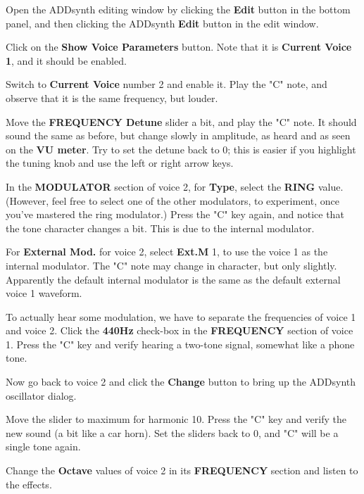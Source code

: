    \begin{enumber}
      \item Open the ADDsynth editing window by clicking the \textbf{Edit} button
         in the bottom panel, and then clicking the ADDsynth \textbf{Edit}
         button in the edit window.
      \item Click on the \textbf{Show Voice Parameters} button.
         Note that it is \textbf{Current Voice 1}, and it should be enabled.
      \item Switch to \textbf{Current Voice} number 2 and enable it.
         Play the "C" note, and observe that it is the same frequency, but
         louder.
      \item Move the \textbf{FREQUENCY Detune} slider a bit, and play the "C"
         note.  It should sound the same as before, but change slowly in
         amplitude, as heard and as seen on the \textbf{VU meter}.
         Try to set the detune back to 0; this is easier if you highlight
         the tuning knob and use the left or right arrow keys.
      \item In the \textbf{MODULATOR} section of voice 2, for \textbf{Type},
         select the \textbf{RING} value.  (However, feel free to select one
         of the other modulators, to experiment, once you've mastered
         the ring modulator.)  Press the "C" key again, and notice
         that the tone character changes a bit.  This is due to the internal
         modulator.
      \item For \textbf{External Mod.} for voice 2, select
         \textbf{Ext.M} 1, to use the voice 1 as the internal modulator.
         The "C" note may change in character, but only slightly.
         Apparently the default internal modulator is the same as the
         default external voice 1 waveform.
      \item To actually hear some modulation, we have to separate the
         frequencies of voice 1 and voice 2.  Click the \textbf{440Hz}
         check-box in the \textbf{FREQUENCY} section of voice 1.  Press the
         "C" key and verify hearing a two-tone signal, somewhat like a phone
         tone.
      \item Now go back to voice 2 and click the \textbf{Change} button to
         bring up the ADDsynth oscillator dialog.
      \item Move the slider to maximum for harmonic 10.  Press the "C" key
         and verify the new sound (a bit like a car horn).
         Set the sliders back to 0, and "C" will be a single tone again.
      \item Change the \textbf{Octave} values of voice 2 in its
         \textbf{FREQUENCY} section and listen to the effects.
   \end{enumber}

